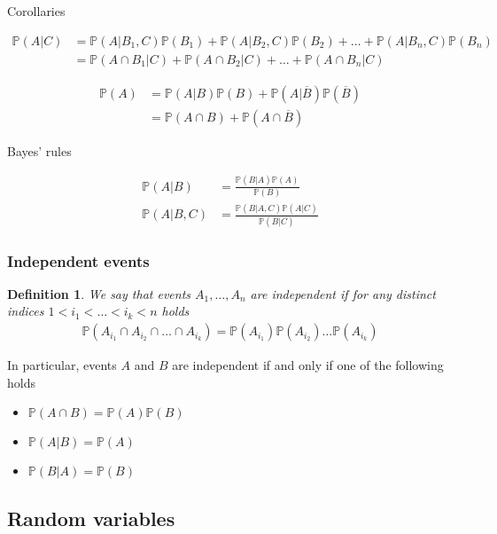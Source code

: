 \documentclass[10pt]{article}
\newtheorem*{definition}{Definition}
\begin{document}
Corollaries

\begin{align}
\mathbb{P}(A|C)
&=\mathbb{P}(A|B_1,C)\mathbb{P}(B_1)+\mathbb{P}(A|B_2,C)\mathbb{P}(B_2)+\ldots+\mathbb{P}(A|B_n,C)\mathbb{P}(B_n)\\
&=\mathbb{P}(A\cap B_1|C)+\mathbb{P}(A\cap B_2|C)+\ldots+\mathbb{P}(A\cap B_n|C)
\end{align}

\begin{align}
\mathbb{P}(A)
&=\mathbb{P}(A|B)\mathbb{P}(B)+\mathbb{P}(A|\overline{B})\mathbb{P}(\overline{B})\\
&=\mathbb{P}(A\cap B)+\mathbb{P}(A\cap\overline{B})
\end{align}

Bayes' rules

\begin{align}
\mathbb{P}(A|B)&=\frac{\mathbb{P}(B|A)\mathbb{P}(A)}{\mathbb{P}(B)}\\
\mathbb{P}(A|B,C)&=\frac{\mathbb{P}(B|A,C)\mathbb{P}(A|C)}{\mathbb{P}(B|C)}
\end{align}

\subsubsection{Independent events}

\begin{definition}
We say that events $A_1,\ldots,A_n$ are independent if for any distinct indices $1<i_1<\ldots<i_k<n$ holds
\begin{align}
\mathbb{P}(A_{i_1}\cap A_{i_2}\cap\ldots\cap A_{i_k})=\mathbb{P}(A_{i_1})\mathbb{P}(A_{i_2})\ldots\mathbb{P}(A_{i_k})
\end{align}
\end{definition}

In particular, events $A$ and $B$ are independent if and only if one of the following holds
\begin{itemize}
\item $\mathbb{P}(A\cap B)=\mathbb{P}(A)\mathbb{P}(B)$
\item $\mathbb{P}(A|B)=\mathbb{P}(A)$
\item $\mathbb{P}(B|A)=\mathbb{P}(B)$
\end{itemize}



\subsection{Random variables}
\end{document}
